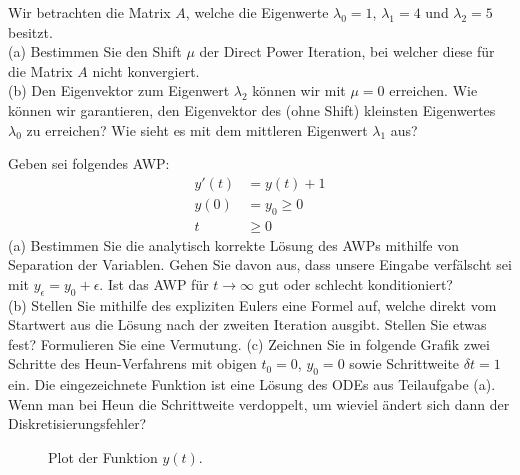 \documentclass{scrartcl}
\begin{document}
	
	
	Wir betrachten die Matrix $A$, welche die Eigenwerte $\lambda_0 = 1$, $\lambda_1 = 4$ und $\lambda_2 = 5$ besitzt. 
	\lbreak \\
	(a)
	Bestimmen Sie den Shift $\mu$ der Direct Power Iteration, bei welcher diese für die Matrix $A$ nicht konvergiert.
	\lbreak \lbreak \lbreak \lbreak
	\\
	(b)
	Den Eigenvektor zum Eigenwert $\lambda_2$ können wir mit $\mu = 0$ erreichen. Wie können wir garantieren, den Eigenvektor des (ohne Shift) kleinsten Eigenwertes $\lambda_0$ zu erreichen? Wie sieht es mit dem mittleren Eigenwert $\lambda_1$ aus?


	
	Geben sei folgendes AWP:
	\begin{align*}
		y'(t) &= y(t) + 1 \\
		y(0) &= y_0 \ge 0 \\
		t &\ge 0
	\end{align*}
	(a)
	Bestimmen Sie die analytisch korrekte Lösung des AWPs mithilfe von Separation der Variablen. Gehen Sie davon aus, dass unsere Eingabe verfälscht sei mit $y_\epsilon = y_0 + \epsilon$. Ist das AWP für $t \rightarrow \infty$ gut oder schlecht konditioniert?
	\lbreak \lbreak \lbreak \lbreak
	\\
	(b)
	Stellen Sie mithilfe des expliziten Eulers eine Formel auf, welche direkt vom Startwert aus die Lösung nach der zweiten Iteration ausgibt. Stellen Sie etwas fest? Formulieren Sie eine Vermutung.
	\newpage
	(c) Zeichnen Sie in folgende Grafik zwei Schritte des Heun-Verfahrens mit obigen $t_0 = 0$, $y_0 = 0$ sowie Schrittweite $\delta t = 1$ ein. Die eingezeichnete Funktion ist eine Lösung des ODEs aus Teilaufgabe (a).
	\n 
	Wenn man bei Heun die Schrittweite verdoppelt, um wieviel ändert sich dann der Diskretisierungsfehler?
	\begin{figure}[ht]
		\centering
		\caption{Plot der Funktion $y(t)$.}
	\end{figure}
\end{document}
